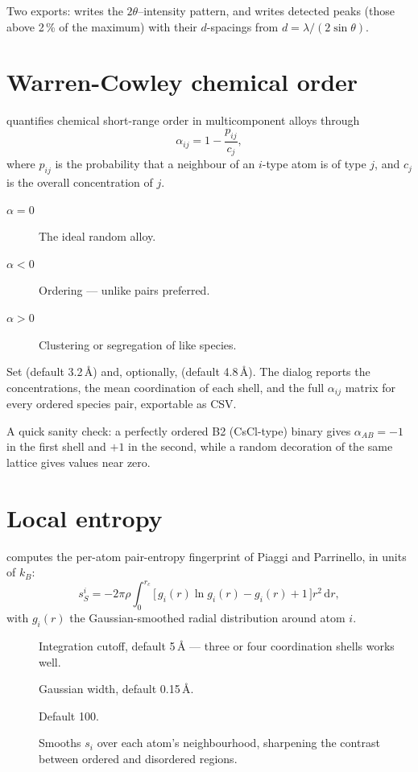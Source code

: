 Two exports:  writes the $2\theta$--intensity
pattern, and  writes detected peaks (those above
2\,\% of the maximum) with their $d$-spacings from
$d = \lambda / (2\sin\theta)$.

\section{Warren-Cowley chemical order}
\label{sec:warren-cowley}

\menusep{} quantifies chemical
short-range order in multicomponent alloys through
\[
  \alpha_{ij} = 1 - \frac{p_{ij}}{c_j},
\]
where $p_{ij}$ is the probability that a neighbour of an $i$-type atom is
of type $j$, and $c_j$ is the overall concentration of $j$.

\begin{description}
  \item[$\alpha = 0$] The ideal random alloy.
  \item[$\alpha < 0$] Ordering --- unlike pairs preferred.
  \item[$\alpha > 0$] Clustering or segregation of like species.
\end{description}

Set  (default 3.2\,\AA) and, optionally,
 (default 4.8\,\AA). The dialog reports the
concentrations, the mean coordination of each shell, and the full
$\alpha_{ij}$ matrix for every ordered species pair, exportable as CSV.

\begin{caltip}
A quick sanity check: a perfectly ordered B2 (CsCl-type) binary gives
$\alpha_{AB} = -1$ in the first shell and $+1$ in the second, while a
random decoration of the same lattice gives values near zero.
\end{caltip}

\section{Local entropy}

\menusep{} computes the per-atom
pair-entropy fingerprint of Piaggi and Parrinello, in units of $k_B$:
\[
  s_S^i = -2\pi\rho \int_0^{r_c}
    \bigl[\, g_i(r)\ln g_i(r) - g_i(r) + 1 \,\bigr] r^2\,\mathrm{d}r ,
\]
with $g_i(r)$ the Gaussian-smoothed radial distribution around atom $i$.

\begin{description}
  \item[] Integration cutoff, default 5\,\AA{} --- three or four
    coordination shells works well.
  \item[] Gaussian width, default 0.15\,\AA.
  \item[] Default 100.
  \item[] Smooths $s_i$ over each atom's
    neighbourhood, sharpening the contrast between ordered and disordered
    regions.
\end{description}

